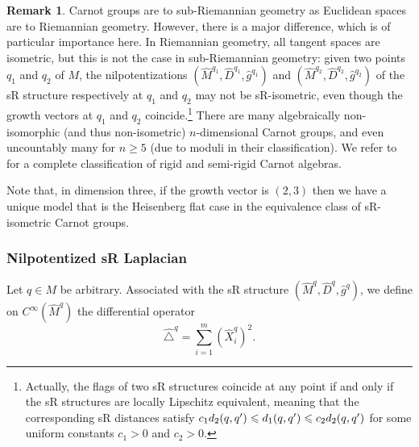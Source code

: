 \documentclass[10pt]{amsart}
\theoremstyle{definition}\newtheorem{defi}[theo]{Definition}\newtheorem{rema}[theo]{Remark}\newtheorem{exam}[theo]{Example}\newtheorem{exem}[theo]{Example}\newtheorem{nota}[theo]{Notation}
\renewcommand{\geq}{\geqslant}
\renewcommand{\leq}{\leqslant}
\begin{document}
\begin{rema}
Carnot groups are to sub-Riemannian geometry as Euclidean spaces are to Riemannian geometry. However, there is a major difference, which is of particular importance here. In Riemannian geometry, all tangent spaces are isometric, but this is not the case in sub-Riemannian geometry: given two points $q_1$ and $q_2$ of $M$, the nilpotentizations $(\widehat{M}^{q_1},\widehat{D}^{q_1},\widehat{g}^{q_1})$ and $(\widehat{M}^{q_2},\widehat{D}^{q_2},\widehat{g}^{q_2})$ of the sR structure respectively at $q_1$ and $q_2$ may not be sR-isometric, even though the growth vectors at $q_1$ and $q_2$ coincide.\footnote{Actually, the flags of two sR structures coincide at any point if and only if the sR structures are locally Lipschitz equivalent, meaning that the corresponding sR distances satisfy $c_1 d_2(q,q')\linebreak\leq d_1(q,q')\leq c_2 d_2(q,q')$ for some uniform constants $c_1>0$ and $c_2>0$.} There are many algebraically non-isomorphic (and thus non-isometric) $n$-dimensional Carnot groups, and even uncountably many for $n\geq 5$ (due to moduli in their classification). We refer to~\cite{AgrachevMarigo_2005,Marigo_2007} for a complete classification of rigid and semi-rigid Carnot algebras.

Note that, in dimension three, if the growth vector is $(2,3)$ then we have a unique model that is the Heisenberg flat case in the equivalence class of sR-isometric Carnot groups.
\end{rema}

\subsubsection{Nilpotentized sR Laplacian}
Let $q\in M$ be arbitrary. Associated with the sR structure $(\widehat{M}^{q},\widehat{D}^{q},\widehat{g}^{q})$, we define on $C^\infty(\widehat{M}^{q})$ the differential operator
\begin{equation}\label{def_triangle_nilp}
\widehat{\triangle}^{q} = \sum_{i=1}^m \left(\widehat{X}^{q}_i\right)^2.
\end{equation}
\end{document}
